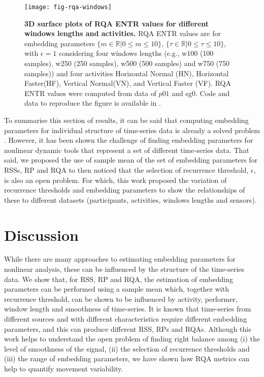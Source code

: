 \documentclass[fleqn,10pt]{wlscirep}
\begin{document}
\begin{figure}[ht]
\centering
\texttt{[image: fig-rqa-windows]}
    \caption{
	{\bf 3D surface plots of RQA ENTR values for different windows lengths and activities.}
	RQA ENTR values are for embedding parameters
	$ \{ m \in \mathbb{R} | 0 \le m \le 10  \}$,
	$ \{ \tau \in \mathbb{R} | 0 \le \tau \le 10  \}$, 
	with $\epsilon = 1 $ considering four 
	windows lengths (e.g., w100 (100 samples), w250 (250 samples),
	w500 (500 samples) and w750 (750 samples)) and
	four activities 
	Horizontal Normal (HN), Horizontal Faster(HF), Vertical Normal(VN), and 
	Vertical Faster (VF).
	RQA ENTR values were computed from data of $p01$ and sg0.
	Code and data to reproduce the figure is available in \cite{srep2020}.
       }
\label{fig:3dRQAENTR_windowsactivities}
\end{figure}

To summarise this section of results, it can be said that computing
embedding parameters for individual structure of time-series 
data is already a solved problem \cite{frank2010, sama2013, bradley2015}. 
However, it has been shown the challenge of finding embedding parameters
for nonlinear dynamic tools that represent a set of different time-series data.
That said, we proposed the use of sample mean of the set of embedding parameters
for RSSs, RP and RQA to then noticed that the selection of recurrence 
threshold, $\epsilon$, is also an open problem.
For which, this work proposed the variation of recurrence thresholds 
and embedding parameters to show the relationships of these to different datasets 
(participants, activities, windows lengths and sensors).

\section*{Discussion}
While there are many approaches to estimating embedding parameters for nonlinear analysis, 
these can be influenced by the structure of the time-series data.   
We show that, for RSS, RP and RQA, the estimation of embedding parameters can be performed 
using a sample mean which, together with recurrence threshold, can be shown to be 
influenced by activity, performer, window length and smoothness of time-series.  
It is known that time-series from different sources and with different characteristics 
require different embedding parameters, and this can produce different RSS, RPs and RQAs. 
Although this work helps to understand the open problem of 
finding right balance among (i) the level of smoothness of the signal, 
(ii) the selection of recurrence thresholds and (iii) 
the range of embedding parameters, 
we have shown how RQA metrics can help to quantify movement variability.
\end{document}
